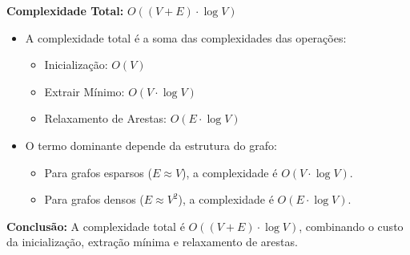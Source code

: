 \documentclass[preview]{standalone}
\begin{document}
\begin{center}
\textbf{Complexidade Total:} $O((V + E) \cdot \log V)$
            \begin{itemize}
                \item A complexidade total é a soma das complexidades das operações:
                    \begin{itemize}
                        \item Inicialização: $O(V)$
                        \item Extrair Mínimo: $O(V \cdot \log V)$
                        \item Relaxamento de Arestas: $O(E \cdot \log V)$
                    \end{itemize}
                \item O termo dominante depende da estrutura do grafo:
                    \begin{itemize}
                        \item Para grafos esparsos ($E \approx V$), a complexidade é $O(V \cdot \log V)$.
                        \item Para grafos densos ($E \approx V^2$), a complexidade é $O(E \cdot \log V)$.
                    \end{itemize}
            \end{itemize}
            
            \textbf{Conclusão:} A complexidade total é $O((V + E) \cdot \log V)$, combinando o custo da inicialização, extração mínima e relaxamento de arestas.
\end{center}
\end{document}
